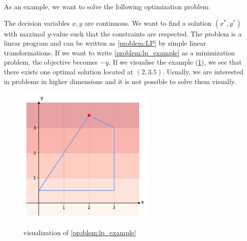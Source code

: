 As an example, we want to solve the following optimization problem: 
The decision variables $x, y$ are continuous. We want to find a solution $(x^*, y^*)$ with maximal $y$-value such that the constraints are respected. The problem is a linear program and can be written as \cref{problem:LP} by simple linear transformations. If we want to write \cref{problem:lp_example} as a minimization problem, the objective becomes $-y$. If we visualise the example (\cref{fig:lp}), we see that there exists one optimal solution located at $(2,3.5)$. Usually, we are interested in problems in higher dimensions and it is not possible to solve them visually.

\begin{figure}[h!]
    \caption{visualization of \cref{problem:lp_example}}
    \centering
    \includegraphics[width=0.6\textwidth]{Images/lp.pdf}
    \label{fig:lp}
\end{figure} 

